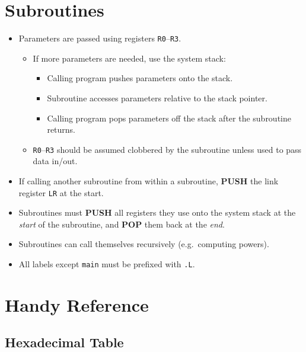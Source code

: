 \documentclass[a4paper, 10pt]{article}
\begin{document}
\section{Subroutines}
\begin{itemize}
  \item Parameters are passed using registers \texttt{R0}--\texttt{R3}.
        \begin{itemize}
          \item If more parameters are needed, use the system stack:
                \begin{itemize}
                  \item Calling program pushes parameters onto the stack.
                  \item Subroutine accesses parameters relative to the stack pointer.
                  \item Calling program pops parameters off the stack after the
                        subroutine returns.
                \end{itemize}
          \item \texttt{R0}--\texttt{R3} should be assumed clobbered by the subroutine
                unless used to pass data in/out.
        \end{itemize}
  \item If calling another subroutine from within a subroutine, \textbf{PUSH} the link
        register \texttt{LR} at the start.
  \item Subroutines must \textbf{PUSH} all registers they use onto the system stack at
        the \emph{start} of the subroutine, and \textbf{POP} them back at the \emph{end}.
  \item Subroutines can call themselves recursively (e.g.\ computing powers).
  \item All labels except \texttt{main} must be prefixed with \texttt{.L}.
\end{itemize}

\section{Handy Reference}

\subsection*{Hexadecimal Table}
\end{document}
